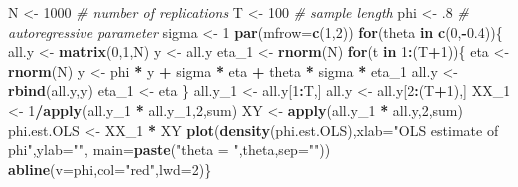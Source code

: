 \documentclass[
  11pt,
]{book}
\newenvironment{Shaded}{\begin{snugshade}}{\end{snugshade}}
\newcommand{\AttributeTok}[1]{\textcolor[rgb]{0.13,0.29,0.53}{#1}}
\newcommand{\CommentTok}[1]{\textcolor[rgb]{0.56,0.35,0.01}{\textit{#1}}}
\newcommand{\ControlFlowTok}[1]{\textcolor[rgb]{0.13,0.29,0.53}{\textbf{#1}}}
\newcommand{\DecValTok}[1]{\textcolor[rgb]{0.00,0.00,0.81}{#1}}
\newcommand{\FloatTok}[1]{\textcolor[rgb]{0.00,0.00,0.81}{#1}}
\newcommand{\FunctionTok}[1]{\textcolor[rgb]{0.13,0.29,0.53}{\textbf{#1}}}
\newcommand{\NormalTok}[1]{#1}
\newcommand{\OtherTok}[1]{\textcolor[rgb]{0.56,0.35,0.01}{#1}}
\newcommand{\SpecialCharTok}[1]{\textcolor[rgb]{0.81,0.36,0.00}{\textbf{#1}}}
\newcommand{\StringTok}[1]{\textcolor[rgb]{0.31,0.60,0.02}{#1}}
\theoremstyle{definition}
\theoremstyle{definition}
\theoremstyle{definition}
\theoremstyle{definition}
\theoremstyle{remark}
\begin{document}
\begin{Shaded}
\begin{Highlighting}[]
\NormalTok{N }\OtherTok{\textless{}{-}} \DecValTok{1000} \CommentTok{\# number of replications}
\NormalTok{T }\OtherTok{\textless{}{-}} \DecValTok{100} \CommentTok{\# sample length}
\NormalTok{phi }\OtherTok{\textless{}{-}}\NormalTok{ .}\DecValTok{8} \CommentTok{\# autoregressive parameter}
\NormalTok{sigma }\OtherTok{\textless{}{-}} \DecValTok{1}
\FunctionTok{par}\NormalTok{(}\AttributeTok{mfrow=}\FunctionTok{c}\NormalTok{(}\DecValTok{1}\NormalTok{,}\DecValTok{2}\NormalTok{))}
\ControlFlowTok{for}\NormalTok{(theta }\ControlFlowTok{in} \FunctionTok{c}\NormalTok{(}\DecValTok{0}\NormalTok{,}\SpecialCharTok{{-}}\FloatTok{0.4}\NormalTok{))\{}
\NormalTok{  all.y }\OtherTok{\textless{}{-}} \FunctionTok{matrix}\NormalTok{(}\DecValTok{0}\NormalTok{,}\DecValTok{1}\NormalTok{,N)}
\NormalTok{  y     }\OtherTok{\textless{}{-}}\NormalTok{ all.y}
\NormalTok{  eta\_1 }\OtherTok{\textless{}{-}} \FunctionTok{rnorm}\NormalTok{(N)}
  \ControlFlowTok{for}\NormalTok{(t }\ControlFlowTok{in} \DecValTok{1}\SpecialCharTok{:}\NormalTok{(T}\SpecialCharTok{+}\DecValTok{1}\NormalTok{))\{}
\NormalTok{    eta }\OtherTok{\textless{}{-}} \FunctionTok{rnorm}\NormalTok{(N)}
\NormalTok{    y }\OtherTok{\textless{}{-}}\NormalTok{ phi }\SpecialCharTok{*}\NormalTok{ y }\SpecialCharTok{+}\NormalTok{ sigma }\SpecialCharTok{*}\NormalTok{ eta }\SpecialCharTok{+}\NormalTok{ theta }\SpecialCharTok{*}\NormalTok{ sigma }\SpecialCharTok{*}\NormalTok{ eta\_1}
\NormalTok{    all.y }\OtherTok{\textless{}{-}} \FunctionTok{rbind}\NormalTok{(all.y,y)}
\NormalTok{    eta\_1 }\OtherTok{\textless{}{-}}\NormalTok{ eta}
\NormalTok{  \}}
\NormalTok{  all.y\_1 }\OtherTok{\textless{}{-}}\NormalTok{ all.y[}\DecValTok{1}\SpecialCharTok{:}\NormalTok{T,]}
\NormalTok{  all.y   }\OtherTok{\textless{}{-}}\NormalTok{ all.y[}\DecValTok{2}\SpecialCharTok{:}\NormalTok{(T}\SpecialCharTok{+}\DecValTok{1}\NormalTok{),]}
\NormalTok{  XX\_1 }\OtherTok{\textless{}{-}} \DecValTok{1}\SpecialCharTok{/}\FunctionTok{apply}\NormalTok{(all.y\_1 }\SpecialCharTok{*}\NormalTok{ all.y\_1,}\DecValTok{2}\NormalTok{,sum)}
\NormalTok{  XY   }\OtherTok{\textless{}{-}} \FunctionTok{apply}\NormalTok{(all.y\_1 }\SpecialCharTok{*}\NormalTok{ all.y,}\DecValTok{2}\NormalTok{,sum)}
\NormalTok{  phi.est.OLS }\OtherTok{\textless{}{-}}\NormalTok{ XX\_1 }\SpecialCharTok{*}\NormalTok{ XY}
  \FunctionTok{plot}\NormalTok{(}\FunctionTok{density}\NormalTok{(phi.est.OLS),}\AttributeTok{xlab=}\StringTok{"OLS estimate of phi"}\NormalTok{,}\AttributeTok{ylab=}\StringTok{""}\NormalTok{,}
       \AttributeTok{main=}\FunctionTok{paste}\NormalTok{(}\StringTok{"theta = "}\NormalTok{,theta,}\AttributeTok{sep=}\StringTok{""}\NormalTok{))}
  \FunctionTok{abline}\NormalTok{(}\AttributeTok{v=}\NormalTok{phi,}\AttributeTok{col=}\StringTok{"red"}\NormalTok{,}\AttributeTok{lwd=}\DecValTok{2}\NormalTok{)\}}
\end{Highlighting}
\end{Shaded}
\end{document}
